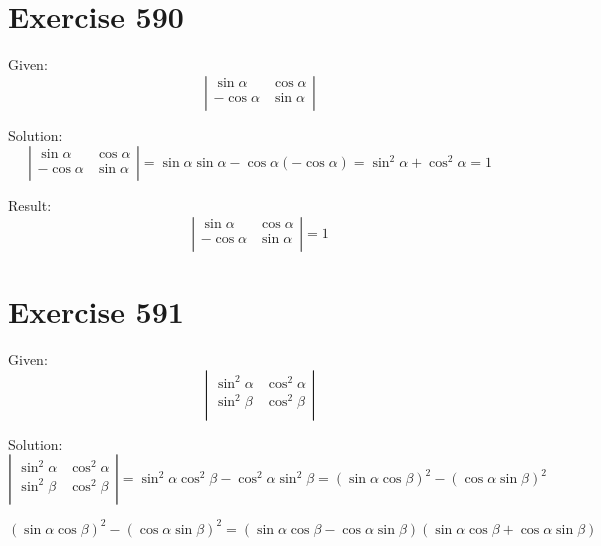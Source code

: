 \documentclass[a4paper, 10pt]{scrartcl}
\begin{document}
\section{Exercise 590}

Given:
\[
    \left|
        \begin{array}{cc}
            \sin{\alpha}  & \cos{\alpha}\\
            -\cos{\alpha} & \sin{\alpha}\\
        \end{array}
    \right|
\]

Solution:
\[
    \left|
        \begin{array}{cc}
            \sin{\alpha}  & \cos{\alpha}\\
            -\cos{\alpha} & \sin{\alpha}\\
        \end{array}
    \right| = \sin{\alpha}\sin{\alpha} - \cos{\alpha}(-\cos{\alpha}) =
              \sin^{2}{\alpha} + \cos^{2}{\alpha} = 1
\]

Result:
\[
    \left|
        \begin{array}{cc}
            \sin{\alpha}  & \cos{\alpha}\\
            -\cos{\alpha} & \sin{\alpha}\\
        \end{array}
    \right| = 1
\]

\section{Exercise 591}

Given:
\[
\left|
    \begin{array}{cc}
        \sin^{2}{\alpha} & \cos^{2}{\alpha}\\
        \sin^{2}{\beta}  & \cos^{2}{\beta}\\
    \end{array}
\right|
\]

Solution:
\[
\left|
    \begin{array}{cc}
        \sin^{2}{\alpha} & \cos^{2}{\alpha}\\
        \sin^{2}{\beta}  & \cos^{2}{\beta}\\
    \end{array}
\right| =
\sin^{2}{\alpha}\cos^{2}{\beta} - \cos^{2}{\alpha}\sin^{2}{\beta} =
(\sin{\alpha}\cos{\beta})^{2} - (\cos{\alpha}\sin{\beta})^{2}
\]

\[
(\sin{\alpha}\cos{\beta})^{2} - (\cos{\alpha}\sin{\beta})^{2} =
(\sin{\alpha}\cos{\beta} - \cos{\alpha}\sin{\beta})
(\sin{\alpha}\cos{\beta} + \cos{\alpha}\sin{\beta})
\]
\end{document}
